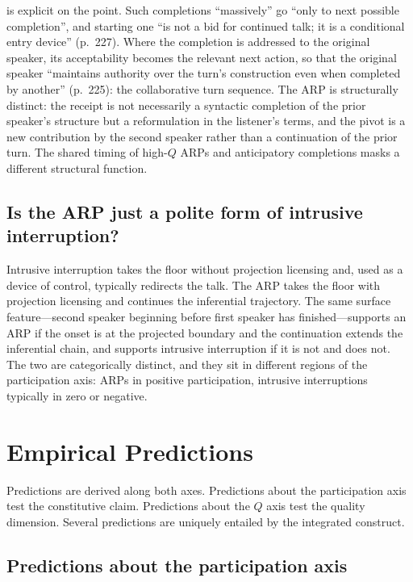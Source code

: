 \citet{Lerner2004} is explicit on the point. Such completions ``massively'' go ``only to next possible completion'', and starting one ``is not a bid for continued talk; it is a conditional entry device'' (p.~227). Where the completion is addressed to the original speaker, its acceptability becomes the relevant next action, so that the original speaker ``maintains authority over the turn's construction even when completed by another'' (p.~225): the collaborative turn sequence. The ARP is structurally distinct: the receipt is not necessarily a syntactic completion of the prior speaker's structure but a reformulation in the listener's terms, and the pivot is a new contribution by the second speaker rather than a continuation of the prior turn. The shared timing of high-$Q$ ARPs and anticipatory completions masks a different structural function.

\subsection{Is the ARP just a polite form of intrusive interruption?}

Intrusive interruption takes the floor without projection licensing and, used as a device of control, typically redirects the talk. The ARP takes the floor with projection licensing and continues the inferential trajectory. The same surface feature---second speaker beginning before first speaker has finished---supports an ARP if the onset is at the projected boundary and the continuation extends the inferential chain, and supports intrusive interruption if it is not and does not. The two are categorically distinct, and they sit in different regions of the participation axis: ARPs in positive participation, intrusive interruptions typically in zero or negative.

\section{Empirical Predictions}\label{sec:predictions}

Predictions are derived along both axes. Predictions about the participation axis test the constitutive claim. Predictions about the $Q$ axis test the quality dimension. Several predictions are uniquely entailed by the integrated construct.

\subsection{Predictions about the participation axis}

